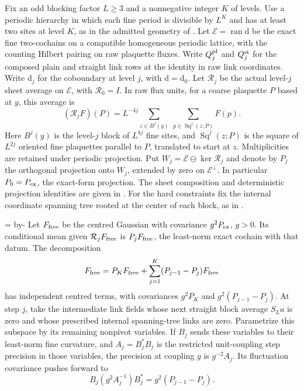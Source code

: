 \documentclass[11pt,letterpaper,reqno]{amsart}
\makeatletter
\numberwithin{equation}{section}
\newcommand{\gineedspace}[1]{\par\begingroup
  \dimen0=\pagegoal\advance\dimen0 by-\pagetotal
  \ifdim\dimen0<#1\relax\newpage\fi\endgroup}
\theoremstyle{definition}
\newcommand{\ms@minorstart}{%
  \pushQED{\qed}\renewcommand{\qedsymbol}{$\blacksquare$}}
\newenvironment{proposition}[1][]{\ms@minorstart\ms@proposition[#1]}
  {\popQED\endms@proposition}
\theoremstyle{remark}
\makeatother
\begin{document}
Fix an odd blocking factor \(L\ge3\) and a nonnegative integer \(K\)
of levels. Use a periodic hierarchy in which each fine
period is divisible by \(L^K\) and has at least two sites
at level \(K\), as in the admitted geometry of \cite{BA,MB}.
Let \(\mathcal E=\operatorname{ran}\mathrm d\) be the exact
fine two-cochains on a compatible homogeneous periodic
lattice, with the counting Hilbert pairing on raw
plaquette fluxes. Write \(Q_j^{\rm pl}\) and \(Q_j^{\rm st}\)
for the composed plain and straight link rows at the identity
in raw link coordinates. Write \(\mathrm d_j\) for the
coboundary at level \(j\), with \(\mathrm d=\mathrm d_0\).
Let \(\mathcal R_j\) be the actual
level-\(j\) sheet average on \(\mathcal E\), with
\(\mathcal R_0=I\). In raw flux units, for a coarse plaquette
\(P\) based at \(y\), this average is
\[
 (\mathcal R_j F)(P)=L^{-4j}
   \sum_{z\in B^j(y)}\ \sum_{p\in\operatorname{Sq}^j(z;P)} F(p).
\]
Here \(B^j(y)\) is the level-\(j\) block of \(L^{4j}\)
fine sites, and \(\operatorname{Sq}^j(z;P)\) is the square
of \(L^{2j}\) oriented fine plaquettes parallel to \(P\),
translated to start at \(z\). Multiplicities are retained
under periodic projection. Put \(W_j=\mathcal E\ominus\ker\mathcal R_j\)
and denote by \(P_j\) the orthogonal projection onto \(W_j\),
extended by zero on \(\mathcal E^\perp\). In particular
\(P_0=P_{\rm ex}\), the exact-form projection.
The sheet composition and deterministic projection identities
are given in \cite[The deterministic curvature slices]{MB}.
For the hard constraints fix the internal coordinate spanning
tree rooted at the center of each block, as in
\cite[Kernel of a flat curvature slice]{MB}.

\gineedspace{18\baselineskip}
\begin{proposition}[Independent curvature slices]
\label{gi:prop-free-slices}
Let \(F_{\rm free}\) be the centred Gaussian with covariance
\(g^2P_{\rm ex}\), \(g>0\). Its conditional mean given
\(\mathcal R_jF_{\rm free}\) is \(P_jF_{\rm free}\), the
least-norm exact cochain with that datum. The decomposition
\begin{equation}\label{gi:eq-free-slices}
 F_{\rm free}=P_KF_{\rm free}+
                    \sum_{j=1}^K(P_{j-1}-P_j)F_{\rm free}
\end{equation}
has independent centred terms, with covariances \(g^2P_K\)
and \(g^2(P_{j-1}-P_j)\). At step \(j\), take the
intermediate link fields whose next straight block average
\(S_La\) is zero and whose prescribed internal spanning-tree links
are zero. Parametrize this subspace by its remaining
nonpivot variables. If \(B_j\) sends these variables to
their least-norm fine curvature, and \(A_j=B_j^*B_j\) is the restricted
unit-coupling step precision in those variables, the precision
at coupling \(g\) is \(g^{-2}A_j\). Its fluctuation covariance
pushes forward to
\[
            B_j(g^2 A_j^{-1})B_j^*
                        =g^2(P_{j-1}-P_j).
\]
\end{proposition}
\end{document}
